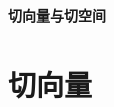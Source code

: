 \documentclass{article}
\begin{document}
\begin{center}
    \LARGE
    \textbf{切向量与切空间}\\
    \vspace{0.2em}
    \large
\end{center}
\section{切向量}
\end{document}
